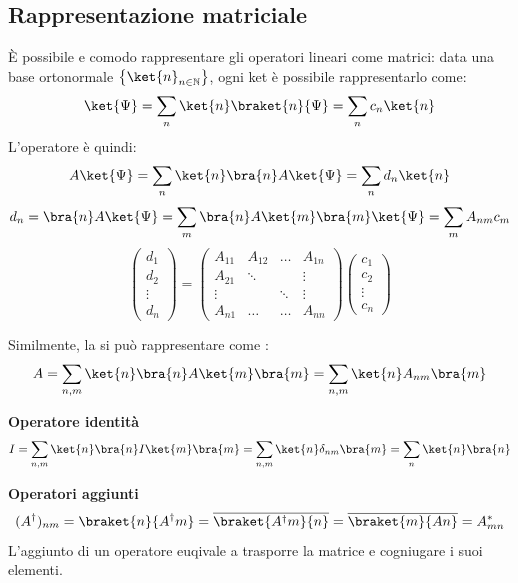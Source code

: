 \subsection{Rappresentazione matriciale}
È possibile e comodo rappresentare gli operatori lineari come matrici:
data una base ortonormale \(\left\{ \ket{n}_{n \in \mathbb{N}} \right\}\),
ogni ket è possibile rappresentarlo come:
\[
\ket{\Psi}= \sum_n \ket{n}\braket{n}{\Psi}= \sum_n c_n \ket{n}
\]
L'operatore è quindi:
\[
    A\ket{\Psi}= \sum_n \ket{n} \bra{n}A\ket{\Psi}= \sum_n d_n \ket{n}
\]
\[
    d_n= \bra{n}A\ket{\Psi} = \sum_m \bra{n} A \ket{m}\bra{m}\ket{\Psi}= \sum_m A_{nm}c_m 
\]
\[
    \begin{pmatrix}
        d_1\\d_2\\ \vdots\\d_n
    \end{pmatrix}= 
    \begin{pmatrix}
        A_{11} & A_{12} & \dots & A_{1n} \\
        A_{21} & \ddots & &\vdots\\
        \vdots& &\ddots & \vdots \\
        A_{n1} & \dots & \dots & A_{nn}
    \end{pmatrix}
    \begin{pmatrix}
        c_1 \\
        c_2\\
        \vdots\\
        c_n 
    \end{pmatrix}
\]

Similmente, la si può rappresentare come :
\begin{equation}
    A = \sum_{n,m} \ket{n} \bra{n}A \ket{m} \bra{m} = \sum_{n,m} \ket{n}  A_{nm} \bra{m}    
\end{equation}

\begin{example}
    \textbf{Operatore identità}
    \begin{equation}
        I= \sum_{n,m} \ket{n}\bra{n} I \ket{m}\bra{m}= \sum_{n,m} \ket{n}\delta_{nm}\bra{m}= \sum_n \ket{n}\bra{n}
    \end{equation}
\end{example}

\begin{example}
    \textbf{Operatori aggiunti}
    \begin{equation}
        (A^\dagger)_{nm}= \braket{n}{A^\dagger m}= \overline{\braket{A^\dagger m}{n}}= \overline{\braket{m}{A n}}= A_{mn}^*
    \end{equation}
    L'aggiunto di un operatore euqivale a trasporre la matrice e cogniugare i suoi elementi.
\end{example}

